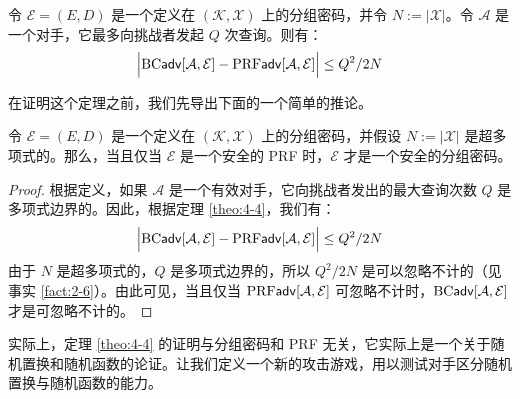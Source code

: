 \begin{theorem}\label{theo:4-4}
令 $\mathcal{E}=(E,D)$ 是一个定义在 $(\mathcal{K},\mathcal{X})$ 上的分组密码，并令 $N:=|\mathcal{X}|$。令 $\mathcal{A}$ 是一个对手，它最多向挑战者发起 $Q$ 次查询。则有：
\[
\Big\lvert
{\rm BC\mathsf{adv}}[\mathcal{A},\mathcal{E}]-{\rm PRF\mathsf{adv}}[\mathcal{A},\mathcal{E}]
\Big\rvert
\leq{Q^2}/{2N}
\]
\end{theorem}

在证明这个定理之前，我们先导出下面的一个简单的推论。

\begin{corollary}\label{cor:4-5}
令 $\mathcal{E}=(E,D)$ 是一个定义在 $(\mathcal{K},\mathcal{X})$ 上的分组密码，并假设 $N:=|\mathcal{X}|$ 是超多项式的。那么，当且仅当 $\mathcal{E}$ 是一个安全的 PRF 时，$\mathcal{E}$ 才是一个安全的分组密码。
\end{corollary}

\begin{proof}
根据定义，如果 $\mathcal{A}$ 是一个有效对手，它向挑战者发出的最大查询次数 $Q$ 是多项式边界的。因此，根据定理 \ref{theo:4-4}，我们有：
\[
\Big\lvert
{\rm BC\mathsf{adv}}[\mathcal{A},\mathcal{E}]-{\rm PRF\mathsf{adv}}[\mathcal{A},\mathcal{E}]
\Big\rvert
\leq{Q^2}/{2N}
\]
由于 $N$ 是超多项式的，$Q$ 是多项式边界的，所以 ${Q^2}/{2N}$ 是可以忽略不计的（见事实 \ref{fact:2-6}）。由此可见，当且仅当 ${\rm PRF\mathsf{adv}}[\mathcal{A},\mathcal{E}]$ 可忽略不计时，${\rm BC\mathsf{adv}}[\mathcal{A},\mathcal{E}]$ 才是可忽略不计的。
\end{proof}

实际上，定理 \ref{theo:4-4} 的证明与分组密码和 PRF 无关，它实际上是一个关于随机置换和随机函数的论证。让我们定义一个新的攻击游戏，用以测试对手区分随机置换与随机函数的能力。

